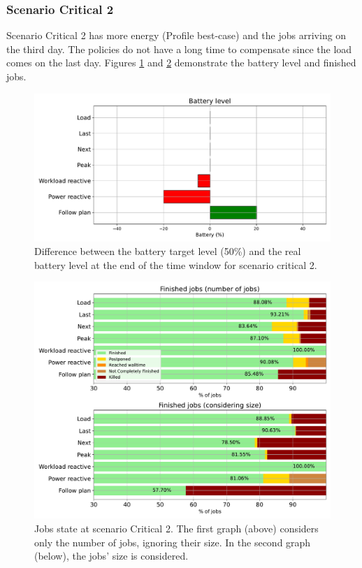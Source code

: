 \subsubsection{Scenario Critical 2}

Scenario Critical 2 has more energy (Profile best-case) and the jobs arriving on the third day. The policies do not have a long time to compensate since the load comes on the last day. Figures \ref{fig:SoC_critical_2} and \ref{fig:jobs_critical_2} demonstrate the battery level and finished jobs. 

\begin{figure}[!htb]
    \centering
    \includegraphics[scale=0.55]{Images/Compensations/battery_critical_2.pdf}
    \caption{Difference between the battery target level (50\%) and the real battery level at the end of the time window for scenario critical 2.}
    \label{fig:SoC_critical_2}
\end{figure}

\begin{figure}[!htb]
    \centering
    \includegraphics[scale=0.55]{Images/Compensations/jobs_critical_2.pdf}
    \caption{Jobs state at scenario Critical 2. The first graph (above) considers only the number of jobs, ignoring their size. In the second graph (below), the jobs' size is considered.}
    \label{fig:jobs_critical_2}
\end{figure}

